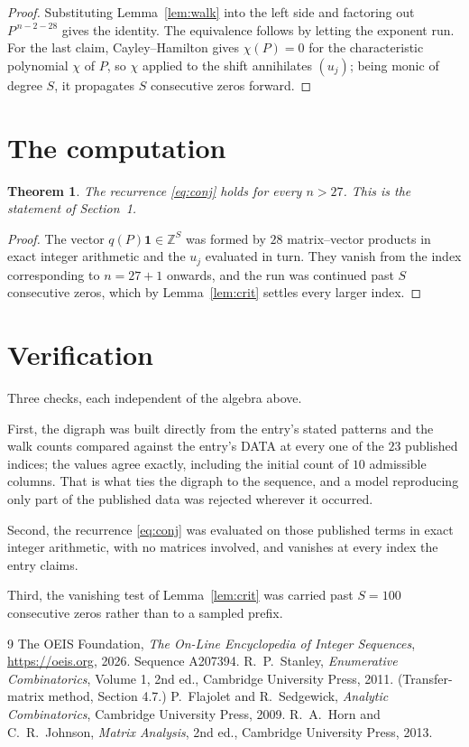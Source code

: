 \documentclass[11pt,a4paper]{article}
\theoremstyle{plain}
\newtheorem{theorem}{Theorem}
\theoremstyle{definition}
\begin{document}
\begin{proof}
Substituting Lemma~\ref{lem:walk} into the left side and factoring out
$P^{\,n-2-28}$ gives the identity. The equivalence follows by letting the exponent
run. For the last claim, Cayley--Hamilton gives $\chi(P)=0$ for the characteristic
polynomial $\chi$ of $P$, so $\chi$ applied to the shift annihilates $(u_j)$; being monic of
degree $S$, it propagates $S$ consecutive zeros forward.
\end{proof}

\section{The computation}

\begin{theorem}
The recurrence \eqref{eq:conj} holds for every $n>27$. This is the statement of
Section~1.
\end{theorem}

\begin{proof}
The vector $q(P)\mathbf{1}\in\mathbb{Z}^{S}$ was formed by $28$ matrix--vector
products in exact integer arithmetic and the $u_j$ evaluated in turn. They vanish from the
index corresponding to $n=27+1$ onwards, and the run was continued past $S$ consecutive
zeros, which by Lemma~\ref{lem:crit} settles every larger index.
\end{proof}

\section{Verification}

Three checks, each independent of the algebra above.

First, the digraph was built directly from the entry's stated patterns and the walk counts
compared against the entry's DATA at every one of the $23$ published indices; the
values agree exactly, including the initial count of $10$ admissible columns. That is
what ties the digraph to the sequence, and a model reproducing only part of the published
data was rejected wherever it occurred.

Second, the recurrence \eqref{eq:conj} was evaluated on those published terms in exact
integer arithmetic, with no matrices involved, and vanishes at every index the entry claims.

Third, the vanishing test of Lemma~\ref{lem:crit} was carried past $S=100$ consecutive
zeros rather than to a sampled prefix.

\begin{thebibliography}{9}
 The OEIS Foundation, \emph{The On-Line Encyclopedia of Integer
Sequences}, \url{https://oeis.org}, 2026. Sequence A207394.
 R.~P.~Stanley, \emph{Enumerative Combinatorics}, Volume 1, 2nd ed.,
Cambridge University Press, 2011. (Transfer-matrix method, Section 4.7.)
 P.~Flajolet and R.~Sedgewick, \emph{Analytic Combinatorics}, Cambridge
University Press, 2009.
 R.~A.~Horn and C.~R.~Johnson, \emph{Matrix Analysis}, 2nd ed., Cambridge
University Press, 2013.
\end{thebibliography}
\end{document}
